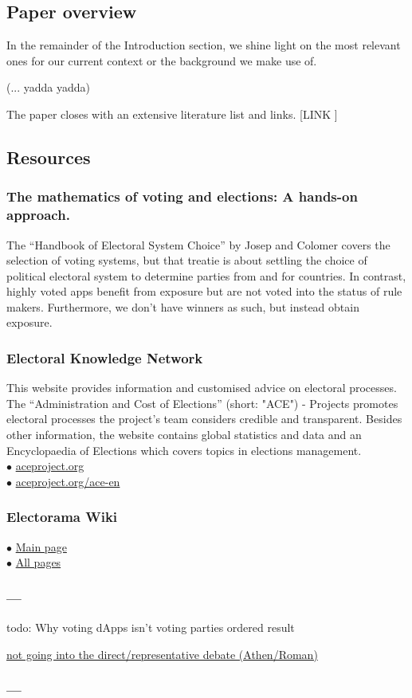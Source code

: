
\subsection{Paper overview}

In the remainder of the Introduction section, we shine light on the most relevant ones for our current context or the background we make use of.

(... yadda yadda)

The paper closes with an extensive literature list and links. [LINK ]

\subsection{Resources} 

\subsubsection{The mathematics of voting and elections: A hands-on approach.}
The ``Handbook of Electoral System Choice'' by Josep and Colomer covers the selection of voting systems, but that treatie is about settling the choice of political electoral system to determine parties from and for countries. In contrast, highly voted apps benefit from exposure but are not voted into the status of rule makers.
Furthermore, we don't have winners as such, but instead obtain exposure.

\subsubsection{Electoral Knowledge Network}
This website provides information and customised advice on electoral processes. 
The ``Administration and Cost of Elections'' (short: "ACE") - Projects promotes electoral processes the project's team considers credible and transparent. 
Besides other information, the website contains global statistics and data and an Encyclopaedia of Elections which covers topics in elections management. \\
$\bullet$ \href{http://www.aceproject.org/}{aceproject.org}\\
$\bullet$ \href{http://aceproject.org/ace-en}{aceproject.org/ace-en}

\subsubsection{Electorama Wiki} 
$\bullet$ \href{https://wiki.electorama.com}{Main page}\\
$\bullet$ \href{hhttps://wiki.electorama.com/wiki/Special:AllPages}{All pages}

\subsubsection{---} 
{todo: Why voting dApps isn't voting parties}
{ordered result}


\href{https://en.wikipedia.org/wiki/Types_of_democracy}{not going into the direct/representative debate (Athen/Roman)}

\subsubsection{---} 